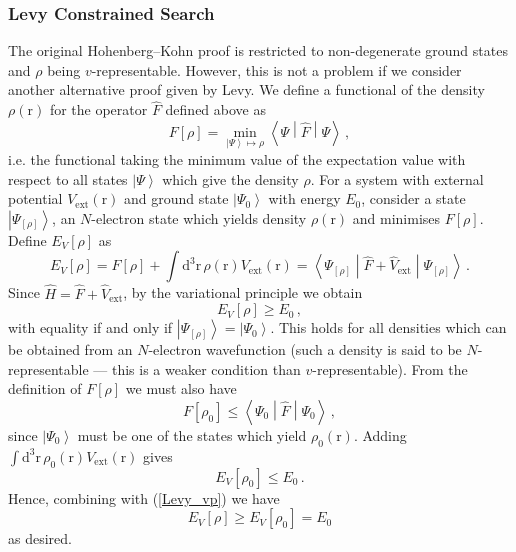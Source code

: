 \documentclass{article}
\theoremstyle{plain}\theoremheaderfont{\normalfont\itshape}\theorembodyfont{\rmfamily}\theoremseparator{.}\newtheorem*{rem}{Remark}\newtheorem*{ex}{Example}\newtheorem*{proof}{Proof}\newtheorem*{altp}{Alternative proof}
\theoremstyle{plain}\theoremheaderfont{\normalfont\bfseries}\theorembodyfont{\rmfamily}\theoremseparator{.}\newtheorem{thm}{Theorem}[section]\newtheorem{lem}[thm]{Lemma}\newtheorem{prop}[thm]{Proposition}\newtheorem*{cor}{Corollary}\newtheorem{defn}[thm]{Definition}\newtheorem{clm}[thm]{Claim}\newtheorem{clminproof}{Claim}
\theoremstyle{break}\theoremheaderfont{\normalfont\itshape}\theorembodyfont{\rmfamily}\theoremseparator{.\medskip}\newtheorem*{proofskip}{Proof}\newtheorem*{exs}{Examples}\newtheorem*{rems}{Remarks}
\theoremstyle{break}\theoremheaderfont{\normalfont\bfseries}\theorembodyfont{\rmfamily}\theoremseparator{.\medskip}\newtheorem{lemskip}[thm]{Lemma}\newtheorem{defnskip}[thm]{Definition}\newtheorem{propskip}[thm]{Proposition}\newtheorem{thmskip}[thm]{Theorem}
\numberwithin{equation}{section}
\newcommand{\dd}[2][]{\mathrm{d}^{#1} #2\,}
\newcommand{\ket}[1]{\left| #1 \right\rangle}
\newcommand{\expval}[2]{\left\langle #2 \middle| #1 \middle| #2 \right\rangle}
\newcommand{\vb}[1]{\bm{\mathrm{#1}}}
\newcommand{\ext}{_{\text{ext}}}
\begin{document}
    \subsubsection{Levy Constrained Search}
    The original Hohenberg--Kohn proof is restricted to non-degenerate ground states and \(\rho\) being \(v\)-representable. However, this is not a problem if we consider another alternative proof given by Levy. We define a functional of the density \(\rho(\vb{r})\) for the operator \(\hat{F}\) defined above as
    \begin{equation}
        F[\rho]=\min_{\ket{\Psi}\mapsto \rho}\expval{\hat{F}}{\Psi}\,,
    \end{equation}
    i.e. the functional taking the minimum value of the expectation value with respect to all states \(\ket{\Psi}\) which give the density \(\rho\). For a system with external potential \(V\ext(\vb{r})\) and ground state \(\ket{\Psi_0}\) with energy \(E_0\), consider a state \(\ket{\Psi_{[\rho]}}\), an \(N\)-electron state which yields density \(\rho(\vb{r})\) and minimises \(F[\rho]\). Define \(E_V[\rho]\) as
    \begin{equation}
        E_V[\rho]=F[\rho]+\int\dd[3]{\vb{r}}\rho(\vb{r})V\ext(\vb{r})=\expval{\hat{F}+\hat{V}\ext}{\Psi_{[\rho]}}\,.
    \end{equation} 
    Since \(\hat{H}=\hat{F}+\hat{V}\ext\), by the variational principle we obtain
    \begin{equation}\label{Levy_vp}
        E_V[\rho]\ge E_0\,,
    \end{equation}
    with equality if and only if \(\ket{\Psi_{[\rho]}}=\ket{\Psi_0}\). This holds for all densities which can be obtained from an \(N\)-electron wavefunction (such a density is said to be \(N\)-representable --- this is a weaker condition than \(v\)-representable). From the definition of \(F[\rho]\) we must also have
    \begin{equation}
        F[\rho_0]\le\expval{\hat{F}}{\Psi_0}\,,
    \end{equation}
    since \(\ket{\Psi_0}\) must be one of the states which yield \(\rho_0(\vb{r})\). Adding \(\int\dd[3]{\vb{r}}\rho_0(\vb{r})V\ext(\vb{r})\) gives
    \begin{equation}
        E_V[\rho_0]\le E_0\,.
    \end{equation}
    Hence, combining with (\ref{Levy_vp}) we have
    \begin{equation}
        E_V[\rho]\ge E_V[\rho_0]=E_0
    \end{equation}
    as desired.
\end{document}
